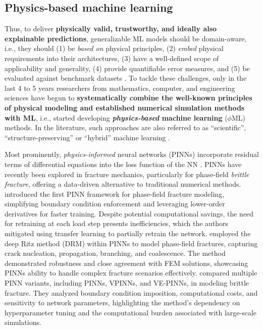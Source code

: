 \documentclass[final,3p,times]{elsarticle}
\begin{document}
\subsection{Physics-based machine learning} \label{sec1-PhysicsML}
Thus, to deliver \textbf{physically valid, trustworthy, and ideally also explainable predictions}, generalizable ML models should be domain-aware, i.e., they should (1) be \emph{based on} physical principles, (2) \emph{embed} physical requirements into their architectures, (3) have a well-defined scope of applicability and generality, (4) provide quantifiable error measures, and (5) be evaluated against benchmark datasets \cite{brodnik2023}. To tackle these challenges,  only in the last 4 to 5 years researchers {from mathematics,  computer, and engineering sciences} have begun to \textbf{systematically combine the well-known principles of physical modeling and established numerical simulation methods with ML}, i.e., started developing \textbf{\emph{physics-based} machine learning} ($\phi$ML) methods.
In the literature, such approaches are also referred to as ``scientific'', ``structure-preserving'' or ``hybrid'' machine learning \cite{baker2019,karniadakis2021piml,as2023mechanics,michopoulos2024scientific}.

Most prominently, \emph{physics-informed} neural networks (PINNs) incorporate residual terms of differential equations into the loss function of the NN \cite{raissi2019,di2024physics}. PINNs have recently been explored in fracture mechanics, particularly for phase-field \emph{brittle fracture}, offering a data-driven alternative to traditional numerical methods. \citet{goswami2020transfer} introduced the first PINN framework for phase-field fracture modeling, simplifying boundary condition enforcement and leveraging lower-order derivatives for faster training. Despite potential computational savings, the need for retraining at each load step presents inefficiencies, which the authors mitigated using transfer learning to partially retrain the network. \citet{manav2024phase} employed the deep Ritz method (DRM) within PINNs to model phase-field fractures, capturing crack nucleation, propagation, branching, and coalescence. The method demonstrated robustness and close agreement with FEM solutions, showcasing PINNs ability to handle complex fracture scenarios effectively. \citet{ghaffari2023deep} compared multiple PINN variants, including PINNs, VPINNs, and VE-PINNs, in modeling brittle fracture. They analyzed boundary condition imposition, computational costs, and sensitivity to network parameters, highlighting the method's dependency on hyperparameter tuning and the computational burden associated with large-scale simulations.
\end{document}
